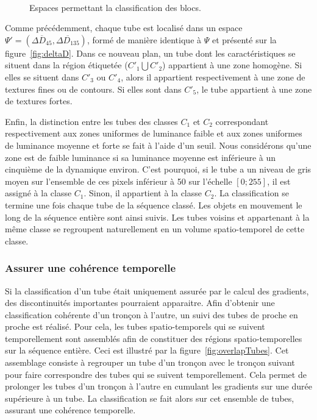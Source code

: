 \begin{figure}[htbp]
	\centering
	\subfloat[\label{fig:deltaHdeltaV}Espace $\Psi=(\overline{\Delta H}, \overline{\Delta V})$ des gradients horizontal et vertical.]{\begin{tikzpicture}[scale=3.2]\end{tikzpicture}}\hfill
	\subfloat[\label{fig:deltaD}Espace $\Psi'=(\overline{\Delta D_{45}}, \overline{\Delta D_{135}})$ des gradients diagonaux.]{\begin{tikzpicture}[scale=3.2]\end{tikzpicture}}\\
	\caption{Espaces permettant la classification des blocs.}
\end{figure}

Comme précédemment, chaque tube est localisé dans un espace $\Psi'=(\overline{\Delta D_{45}}, \overline{\Delta D_{135}})$, formé de manière identique à $\Psi$ et présenté sur la figure~\ref{fig:deltaD}. Dans ce nouveau plan, un tube dont les caractéristiques se situent dans la région étiquetée ($C'_1\bigcup C'_2$) appartient à une zone homogène. Si elles se situent dans $C'_3$ ou $C'_4$, alors il appartient respectivement à une zone de textures fines ou de contours. Si elles sont dans $C'_5$, le tube appartient à une zone de textures fortes.

Enfin, la distinction entre les tubes des classes $C_1$ et $C_2$ correspondant respectivement aux zones uniformes de luminance faible et aux zones uniformes de luminance moyenne et forte se fait à l'aide d'un seuil. Nous considérons qu'une zone est de faible luminance si sa luminance moyenne est inférieure à un cinquième de la dynamique environ. C'est pourquoi, si le tube a un niveau de gris moyen sur l'ensemble de ces pixels inférieur à 50 sur l'échelle $[\text{0};\text{255}]$, il est assigné à la classe $C_1$. Sinon, il appartient à la classe $C_2$. La classification se termine une fois chaque tube de la séquence classé. Les objets en mouvement le long de la séquence entière sont ainsi suivis. Les tubes voisins et appartenant à la même classe se regroupent naturellement en un volume spatio-temporel de cette classe.


\subsubsection{Assurer une cohérence temporelle}
Si la classification d'un tube était uniquement assurée par le calcul des gradients, des discontinuités importantes pourraient apparaitre. Afin d'obtenir une classification cohérente d'un tronçon à l'autre, un suivi des tubes de proche en proche est réalisé. Pour cela, les tubes spatio-temporels qui se suivent temporellement sont assemblés afin de constituer des régions spatio-temporelles sur la séquence entière. Ceci est illustré par la figure~\ref{fig:overlapTubes}. Cet assemblage consiste à regrouper un tube d'un tronçon avec le tronçon suivant pour faire correspondre des tubes qui se suivent temporellement. Cela permet de prolonger les tubes d'un tronçon à l'autre en cumulant les gradients sur une durée supérieure à un tube. La classification se fait alors sur cet ensemble de tubes, assurant une cohérence temporelle.

